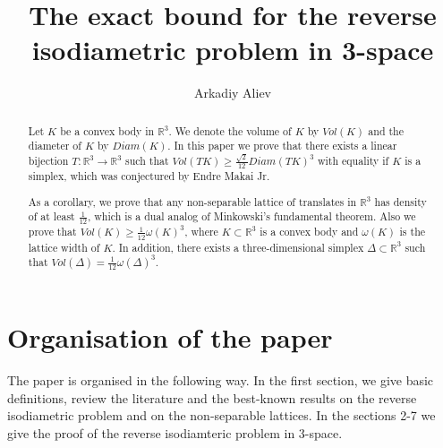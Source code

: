 \documentclass[12pt]{article}
\begin{document}
\title{The exact bound for the reverse isodiametric problem in 3-space
}
\author{Arkadiy Aliev}
\date{}
\maketitle

    \begin{abstract}
        Let $K$ be a convex body in $\mathbb{R}^{3}$. We denote the volume of $K$ by $Vol(K)$ and the diameter of $K$ by $Diam(K).$  In this paper we prove that there exists a linear bijection $T:\mathbb{R}^{3}\to \mathbb{R}^{3}$ such that $Vol(TK)\geq \frac{\sqrt{2}}{12}Diam(TK)^3$ with equality if $K$ is a simplex, which was conjectured by Endre Makai Jr.  
        
        As a corollary, we prove that any non-separable lattice of translates in $\mathbb{R}^{3}$ has density of at least $\frac{1}{12}$, which is a dual analog of Minkowski's fundamental theorem.  Also we prove that  $Vol(K)\geq \frac{1}{12}\omega(K)^3$, where $K\subset \mathbb{R}^{3}$ is a convex body and  $\omega(K)$ is the lattice width of $K$. In addition, there exists a  three-dimensional simplex $\Delta\subset \mathbb{R}^3$ such that $Vol(\Delta) = \frac{1}{12}\omega(\Delta)^3.$ 
    \end{abstract}



\section*{Organisation of the paper}

        The paper is organised in the following way. In the first section, we give basic definitions, review  the literature and the best-known results on the reverse isodiametric problem and on the non-separable lattices. In the sections 2-7 we give the proof of the reverse isodiamteric problem in 3-space.   
    \tableofcontents
\end{document}
